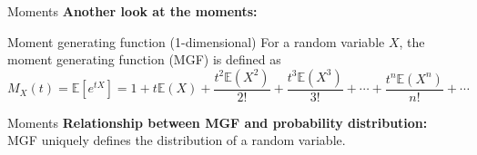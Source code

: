 \documentclass [aspectratio=169]{beamer}
\begin{document}
\begin{frame}{Moments}
\textbf{Another look at the moments:}
\begin{block}{Moment generating function (1-dimensional)}
    For a random variable $X$, the moment generating function (MGF) is defined as 
    $$
    M_{X}(t)=\mathbb{E} \left[e^{tX}\right] = 1+t\mathbb{E} (X)+{\frac {t^{2}\mathbb{E} (X^{2})}{2!}}+{\frac {t^{3}\mathbb{E} (X^{3})}{3!}}+\cdots +{\frac {t^{n}\mathbb{E}(X^{n})}{n!}}+\cdots
    $$
\end{block}
\vspace{0.1in}
\end{frame}

\begin{frame}{Moments}
\textbf{Relationship between MGF and probability distribution:}\\
    MGF uniquely defines the distribution of a random variable.\\
\vspace{0.1in}
\end{frame}
\end{document}
